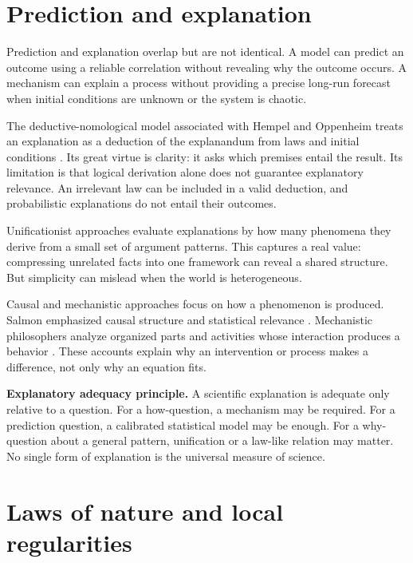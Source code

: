 \section{Prediction and explanation}

Prediction and explanation overlap but are not identical. A model can predict
an outcome using a reliable correlation without revealing why the outcome
occurs. A mechanism can explain a process without providing a precise long-run
forecast when initial conditions are unknown or the system is chaotic.

The deductive-nomological model associated with Hempel and Oppenheim treats an
explanation as a deduction of the explanandum from laws and initial conditions
\citep{hempeloppenheim1948,hempel1965}. Its great virtue is clarity: it asks
which premises entail the result. Its limitation is that logical derivation
alone does not guarantee explanatory relevance. An irrelevant law can be
included in a valid deduction, and probabilistic explanations do not entail
their outcomes.

Unificationist approaches evaluate explanations by how many phenomena they
derive from a small set of argument patterns. This captures a real value:
compressing unrelated facts into one framework can reveal a shared structure.
But simplicity can mislead when the world is heterogeneous.

Causal and mechanistic approaches focus on how a phenomenon is produced.
Salmon emphasized causal structure and statistical relevance
\citep{salmon1984}. Mechanistic philosophers analyze organized parts and
activities whose interaction produces a behavior
\citep{bechtel2005,craver2007}. These accounts explain why an intervention or
process makes a difference, not only why an equation fits.

\begin{principlebox}
\textbf{Explanatory adequacy principle.} A scientific explanation is adequate
only relative to a question. For a how-question, a mechanism may be required.
For a prediction question, a calibrated statistical model may be enough. For a
why-question about a general pattern, unification or a law-like relation may
matter. No single form of explanation is the universal measure of science.
\end{principlebox}

\section{Laws of nature and local regularities}

